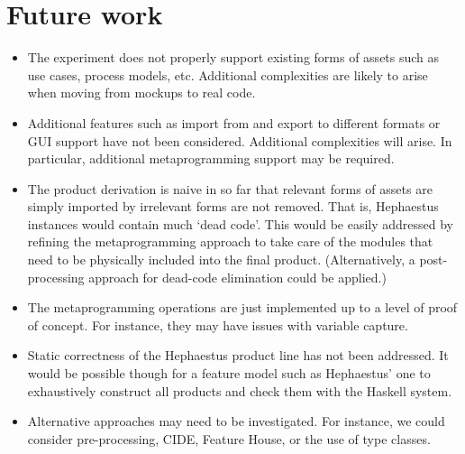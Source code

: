 \documentclass{article}
\begin{document}
\section{Future work}

\begin{itemize}

\item The experiment does not properly support existing forms of assets such as use cases, process models, etc. Additional complexities are likely to arise when moving from mockups to real code.

\item Additional features such as import from and export to different formats or GUI support have not been considered. Additional complexities will arise. In particular, additional metaprogramming support may be required.

\item The product derivation is naive in so far that relevant forms of assets are simply imported by irrelevant forms are not removed. That is, Hephaestus instances would contain much `dead code'. This would be easily addressed by refining the metaprogramming approach to take care of the modules that need to be physically included into the final product. (Alternatively, a post-processing approach for dead-code elimination could be applied.)

\item The metaprogramming operations are just implemented up to a level of proof of concept. For instance, they may have issues with variable capture.

\item Static correctness of the Hephaestus product line has not been addressed. It would be possible though for a feature model such as Hephaestus' one to exhaustively construct all products and check them with the Haskell system.

\item Alternative approaches may need to be investigated. For instance, we could consider pre-processing, CIDE, Feature House, or the use of type classes.

\end{itemize}
\end{document}
